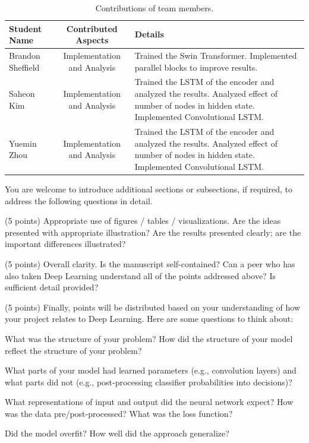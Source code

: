 \documentclass[10pt,twocolumn,letterpaper]{article}
\begin{document}
\begin{table}
\begin{center}
\begin{tabular}{|l|c|p{8cm}|}
\hline
Student Name & Contributed Aspects & Details \\
\hline\hline
Brandon Sheffield & Implementation and Analysis & Trained the Swin Transformer. Implemented parallel blocks to improve results. \\
Saheon Kim & Implementation and Analysis & Trained the LSTM of the encoder and analyzed the results. Analyzed effect of number of nodes in hidden state.  Implemented Convolutional LSTM. \\
Yuemin Zhou & Implementation and Analysis & Trained the LSTM of the encoder and analyzed the results. Analyzed effect of number of nodes in hidden state.  Implemented Convolutional LSTM. \\
\hline
\end{tabular}
\end{center}
\caption{Contributions of team members.}
\label{tab:contributions}
\end{table}


You are welcome to introduce additional sections or subsections, if required, to address the following questions in detail. 

(5 points) Appropriate use of figures / tables / visualizations. Are the ideas presented with appropriate illustration? Are the results presented clearly; are the important differences illustrated? 

(5 points) Overall clarity. Is the manuscript self-contained? Can a peer who has also taken Deep Learning understand all of the points addressed above? Is sufficient detail provided? 

(5 points) Finally, points will be distributed based on your understanding of how your project relates to Deep Learning. Here are some questions to think about: 

What was the structure of your problem? How did the structure of your model reflect the structure of your problem? 

What parts of your model had learned parameters (e.g., convolution layers) and what parts did not (e.g., post-processing classifier probabilities into decisions)? 

What representations of input and output did the neural network expect? How was the data pre/post-processed?
What was the loss function? 

Did the model overfit? How well did the approach generalize? 
\end{document}
